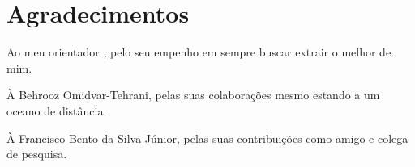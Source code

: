 
\chapter*{Agradecimentos}

Ao meu orientador \mySupervisorName, pelo seu empenho em sempre buscar extrair o melhor de mim.

À Behrooz Omidvar-Tehrani, pelas suas colaborações mesmo estando a um oceano de distância.

À Francisco Bento da Silva Júnior, pelas suas contribuições como amigo e colega de pesquisa.
